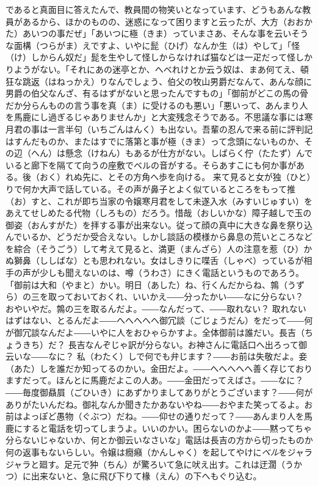 \documentclass{book}
\begin{document}
であると真面目に答えたんで、教員間の物笑いとなっています、どうもあんな教員があるから、ほかのものの、迷惑になって困りますと云ったが、大方（おおかた）あいつの事だぜ」「あいつに極（きま）っていまさあ、そんな事を云いそうな面構（つらがま）えですよ、いやに髭（ひげ）なんか生（は）やして」「怪（け）しからん奴だ」髭を生やして怪しからなければ猫などは一疋だって怪しかりようがない。「それにあの迷亭とか、へべれけとか云う奴は、まあ何てえ、頓狂な跳返（はねっかえ）りなんでしょう、伯父の牧山男爵だなんて、あんな顔に男爵の伯父なんざ、有るはずがないと思ったんですもの」「御前がどこの馬の骨だか分らんものの言う事を真（ま）に受けるのも悪い」「悪いって、あんまり人を馬鹿にし過ぎるじゃありませんか」と大変残念そうである。不思議な事には寒月君の事は一言半句（いちごんはんく）も出ない。吾輩の忍んで来る前に評判記はすんだものか、またはすでに落第と事が極（きま）って念頭にないものか、その辺（へん）は懸念（けねん）もあるが仕方がない。しばらく佇（たたず）んでいると廊下を隔てて向うの座敷でベルの音がする。そらあすこにも何か事がある。後（おく）れぬ先に、とその方角へ歩を向ける。
来て見ると女が独（ひと）りで何か大声で話している。その声が鼻子とよく似ているところをもって推（お）すと、これが即ち当家の令嬢寒月君をして未遂入水（みすいじゅすい）をあえてせしめたる代物（しろもの）だろう。惜哉（おしいかな）障子越しで玉の御姿（おんすがた）を拝する事が出来ない。従って顔の真中に大きな鼻を祭り込んでいるか、どうだか受合えない。しかし談話の模様から鼻息の荒いところなどを綜合（そうごう）して考えて見ると、満更（まんざら）人の注意を惹（ひ）かぬ獅鼻（ししばな）とも思われない。女はしきりに喋舌（しゃべ）っているが相手の声が少しも聞えないのは、噂（うわさ）にきく電話というものであろう。「御前は大和（やまと）かい。明日（あした）ね、行くんだからね、鶉（うずら）の三を取っておいておくれ、いいかえ――分ったかい――なに分らない？ おやいやだ。鶉の三を取るんだよ。――なんだって、――取れない？ 取れないはずはない、とるんだよ――へへへへへ御冗談（ごじょうだん）をだって――何が御冗談なんだよ――いやに人をおひゃらかすよ。全体御前は誰だい。長吉（ちょうきち）だ？ 長吉なんぞじゃ訳が分らない。お神さんに電話口へ出ろって御云いな――なに？ 私（わたく）しで何でも弁じます？――お前は失敬だよ。妾（あた）しを誰だか知ってるのかい。金田だよ。――へへへへへ善く存じておりますだって。ほんとに馬鹿だよこの人あ。――金田だってえばさ。――なに？――毎度御贔屓（ごひいき）にあずかりましてありがとうございます？――何がありがたいんだね。御礼なんか聞きたかあないやね――おやまた笑ってるよ。お前はよっぽど愚物（ぐぶつ）だね。――仰せの通りだって？――あんまり人を馬鹿にすると電話を切ってしまうよ。いいのかい。困らないのかよ――黙ってちゃ分らないじゃないか、何とか御云いなさいな」電話は長吉の方から切ったものか何の返事もないらしい。令嬢は癇癪（かんしゃく）を起してやけに\emph{ベル}をジャラジャラと廻す。足元で狆（ちん）が驚ろいて急に吠え出す。これは迂濶（うかつ）に出来ないと、急に飛び下りて椽（えん）の下へもぐり込む。
\end{document}
